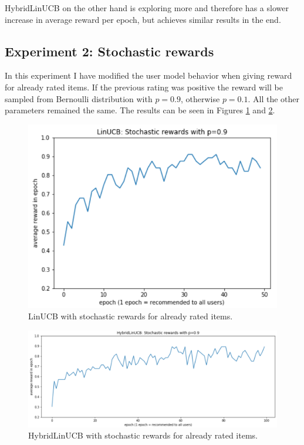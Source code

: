 \documentclass[12pt, titlepage]{article}
\begin{document}
HybridLinUCB on the other hand is exploring more and therefore has a slower increase in average reward per epoch, but achieves similar results in the end.

\subsection{Experiment 2: Stochastic rewards}
In this experiment I have modified the user model behavior when giving reward for already rated items.
If the previous rating was positive the reward will be sampled from Bernoulli distribution with $p=0.9$, otherwise $p=0.1$.
All the other parameters remained the same. The results can be seen in Figures \ref{fig:linUCB-stochastic} and \ref{fig:HybridlinUCB-stochastic}. 


\begin{figure}[h!]
 \centering
 \includegraphics[scale=0.5]{img/LinUCB-stochastic}
 \caption{LinUCB with stochastic rewards for already rated items.}
 \label{fig:linUCB-stochastic}
\end{figure}

\begin{figure}[h!]
 \centering
 \includegraphics[scale=0.5]{img/HybridLinUCB-stochastic-100}
 \caption{HybridLinUCB with stochastic rewards for already rated items. }
 \label{fig:HybridlinUCB-stochastic}
\end{figure}
\end{document}
